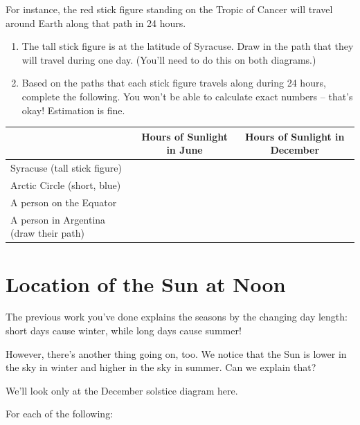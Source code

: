 \documentclass[12pt]{article}
\begin{document}
For instance, the red stick figure standing on the Tropic of Cancer will travel around Earth along that path in 24 hours.
\begin{enumerate}\addtocounter{enumi}{1}
	
	\item The tall stick figure is at the latitude of Syracuse. Draw in the path that they will travel during one day. (You'll need to do this on both diagrams.)
	
	\item 
	Based on the paths that each stick figure travels along during 24 hours, complete the following. You won't be able to calculate exact numbers -- that's okay! Estimation is fine.
	
\end{enumerate}









\begin{tabular}{|p{50mm}|c|c|}
\hline
	\null & Hours of Sunlight in June & Hours of Sunlight in December \\ \hline
	
	Syracuse (tall stick figure) & & \\[20pt] \hline
	
	Arctic Circle (short, blue) & & \\[20pt] \hline
	
	A person on the Equator & & \\[20pt] \hline
	
	A person in Argentina \newline (draw their path) & & \\[20pt] \hline
\end{tabular}


\section{Location of the Sun at Noon}

The previous work you've done explains the seasons by the changing day length: short days cause winter, while long days cause summer!

However, there's another thing going on, too. We notice that the Sun is lower in the sky in winter and higher in the sky in summer. Can we explain that?

We'll look only at the December solstice diagram here.

For each of the following: 
\end{document}
